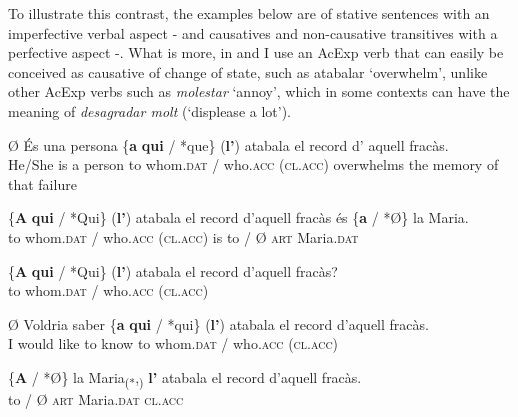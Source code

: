 \documentclass[output=paper,colorlinks,citecolor=brown,nonflat]{./langscibook}
\begin{document}
To illustrate this contrast, the examples below are of stative sentences with an imperfective verbal aspect -  and causatives and non-causative transitives with a perfective aspect -. What is more, in  and  I use an AcExp verb that can easily be conceived as causative of change of state, such as {atabalar} ‘overwhelm’, unlike other AcExp verbs such as \textit{molestar} ‘annoy’, which in some contexts can have the meaning of  \textit{desagradar molt} (‘displease a lot’).

\ea%
 \label{ex:royo:14}
 \ea \label{ex:royo:14a}
 \gll Ø És una persona \{\textbf{a} \textbf{qui} / *que\} (\textbf{l’}) atabala el record d’ aquell fracàs.\\
  He/She is a person to whom.\textsc{dat} / who.\textsc{acc} (\textsc{cl.acc}) overwhelms the memory of that failure \\
\glt {}
 
 \ex \label{ex:royo:14b}
 \gll \{\textbf{A} \textbf{qui} / *Qui\} (\textbf{l’}) atabala el record d’aquell fracàs és \{\textbf{a} / *Ø\} la Maria.\\
 to whom.\textsc{dat} / who.\textsc{acc} (\textsc{cl.acc}) is to / Ø \textsc{art} Maria.\textsc{dat} \\
\glt {}
 
 \ex \label{ex:royo:14c}
 \gll \{\textbf{A} \textbf{qui} / *Qui\} (\textbf{l’}) atabala el record d’aquell fracàs?\\
 to whom.\textsc{dat} / who.\textsc{acc} (\textsc{cl.acc}) \\
\glt {}
 
 \ex \label{ex:royo:14d}
 \gll Ø Voldria saber \{\textbf{a} \textbf{qui} / *qui\} (\textbf{l’}) atabala el record d’aquell fracàs.\\
 I would like to know to whom.\textsc{dat} / who.\textsc{acc} (\textsc{cl.acc}) \\
\glt {}
 
 \ex \label{ex:royo:14e}
 \gll \{\textbf{A} / *Ø\} la Maria\textsubscript{(*},\textsubscript{)} \textbf{l’} atabala el record d’aquell fracàs.\\
 to / Ø \textsc{art} Maria.\textsc{dat} \textsc{cl.acc} \\
\glt {}
 
 
 \z
 \z
 
\end{document}
